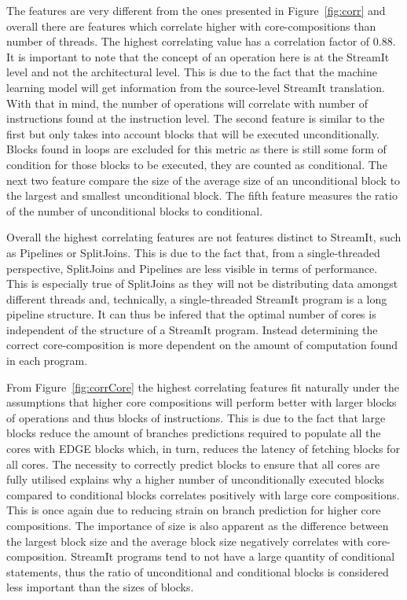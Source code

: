 The features are very different from the ones presented in Figure~\ref{fig:corr} and overall there are features which correlate higher with core-compositions than number of threads.
The highest correlating value has a correlation factor of 0.88.
It is important to note that the concept of an operation here is at the StreamIt level and not the architectural level.
This is due to the fact that the machine learning model will get information from the source-level StreamIt translation.
With that in mind, the number of operations will correlate with number of instructions found at the instruction level.
The second feature is similar to the first but only takes into account blocks that will be executed unconditionally.
Blocks found in loops are excluded for this metric as there is still some form of condition for those blocks to be executed, they are counted as conditional.
The next two feature compare the size of the average size of an unconditional block to the largest and smallest unconditional block.
The fifth feature measures the ratio of the number of unconditional blocks to conditional.

Overall the highest correlating features are not features distinct to StreamIt, such as Pipelines or SplitJoins.
This is due to the fact that, from a single-threaded perspective, SplitJoins and Pipelines are less visible in terms of performance.
This is especially true of SplitJoins as they will not be distributing data amongst different threads and, technically, a single-threaded StreamIt program is a long pipeline structure.
It can thus be infered that the optimal number of cores is independent of the structure of a StreamIt program.
Instead determining the correct core-composition is more dependent on the amount of computation found in each program.

From Figure~\ref{fig:corrCore} the highest correlating features fit naturally under the assumptions that higher core compositions will perform better with larger blocks of operations and thus blocks of instructions.
This is due to the fact that large blocks reduce the amount of branches predictions required to populate all the cores with EDGE blocks which, in turn, reduces the latency of fetching blocks for all cores.
The necessity to correctly predict blocks to ensure that all cores are fully utilised explains why a higher number of unconditionally executed blocks compared to conditional blocks correlates positively with large core compositions.
This is once again due to reducing strain on branch prediction for higher core compositions.
The importance of size is also apparent as the difference between the largest block size and the average block size negatively correlates with core-composition.
StreamIt programs tend to not have a large quantity of conditional statements, thus the ratio of unconditional and conditional blocks is considered less important than the sizes of blocks.

